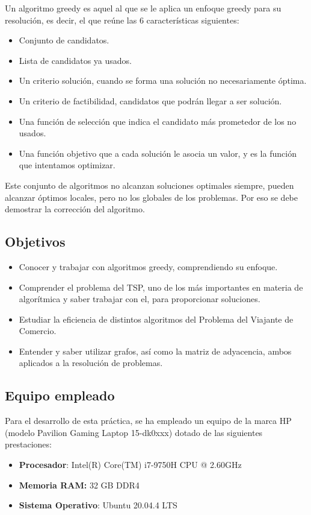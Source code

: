 Un algoritmo greedy es aquel al que se le aplica un enfoque greedy para su resolución, es decir, el que reúne las 6 características siguientes:
\begin{itemize}
    \item Conjunto de candidatos.
    \item Lista de candidatos ya usados.
    \item Un criterio solución, cuando se forma una solución no necesariamente óptima.
    \item Un criterio de factibilidad, candidatos que podrán llegar a ser solución.
    \item Una función de selección que indica el candidato más prometedor de los no usados.
    \item Una función objetivo que a cada solución le asocia un valor, y es la función que intentamos optimizar.
\end{itemize}

Este conjunto de algoritmos no alcanzan soluciones optimales siempre, pueden alcanzar óptimos locales, pero no los globales de los problemas.
Por eso se debe demostrar la corrección del algoritmo.

\subsection{Objetivos}
\begin{itemize}
    \item Conocer y trabajar con algoritmos greedy, comprendiendo su enfoque.
    \item Comprender el problema del TSP, uno de los más importantes en materia de algorítmica y saber trabajar con el, para proporcionar soluciones.
    \item Estudiar la eficiencia de distintos algoritmos del Problema del Viajante de Comercio.
    \item Entender y saber utilizar grafos, así como la matriz de adyacencia, ambos aplicados a la resolución de problemas.
\end{itemize}

\subsection{Equipo empleado}

Para el desarrollo de esta práctica, se ha empleado un equipo de la marca HP (modelo Pavilion Gaming Laptop 15-dk0xxx) 
dotado de las siguientes prestaciones: 

\begin{itemize}
    \item \textbf{Procesador}: Intel(R) Core(TM) i7-9750H CPU @ 2.60GHz
    \item \textbf{Memoria RAM:} 32 GB DDR4
    \item \textbf{Sistema Operativo}: Ubuntu 20.04.4 LTS
\end{itemize}